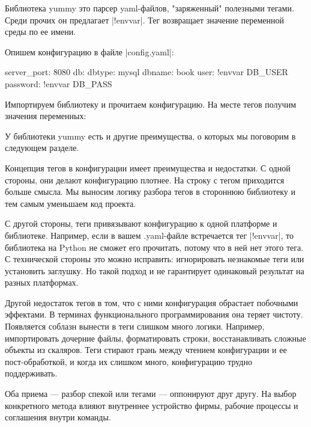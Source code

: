 Библиотека yummy это парсер yaml-файлов, "заряженный" полезными тегами. Среди
прочих он предлагает \spverb|!envvar|. Тег возвращает значение переменной среды по ее
имени.

Опишем конфигурацию в файле \spverb|config.yaml|:

\begin{code}
server_port: 8080
db:
  dbtype:   mysql
  dbname:   book
  user:     !envvar DB_USER
  password: !envvar DB_PASS
\end{code}

Импортируем библиотеку и прочитаем конфигурацию. На месте тегов получим значения
переменных:

\begin{code}
(require '[yummy.config :as yummy])
(yummy/load-config {:path "config.yaml"})

{:server_port 8080
 :db {:dbtype "mysql"
      :dbname "book"
      :user "ivan"
      :password "*(&fd}A53z#$!"}}
\end{code}

У библиотеки yummy есть и другие преимущества, о которых мы поговорим в
следующем разделе.

Концепция тегов в конфигурации имеет преимущества и недостатки. С одной стороны,
они делают конфигурацию плотнее. На строку с тегом приходится больше смысла. Мы
выносим логику разбора тегов в стороннюю библиотеку и тем самым уменьшаем код
проекта.

С другой стороны, теги привязывают конфигурацию к одной платформе и
библиотеке. Например, если в вашем .yaml-файле встречается тег \spverb|!envvar|, то
библиотека на Python не сможет его прочитать, потому что в ней нет этого тега. С
технической стороны это можно исправить: игнорировать незнакомые теги или
установить заглушку. Но такой подход и не гарантирует одинаковый результат на
разных платформах.

Другой недостаток тегов в том, что с ними конфигурация обрастает побочными
эффектами. В терминах функционального программирования она теряет
чистоту. Появляется соблазн вынести в теги слишком много логики. Например,
импортировать дочерние файлы, форматировать строки, восстанавливать сложные
объекты из скаляров. Теги стирают грань между чтением конфигурации и ее
пост-обработкой, и когда их слишком много, конфигурацию трудно поддерживать.

Оба приема — разбор спекой или тегами — оппонируют друг другу. На выбор
конкретного метода влияют внутреннее устройство фирмы, рабочие процессы и
соглашения внутри команды.

